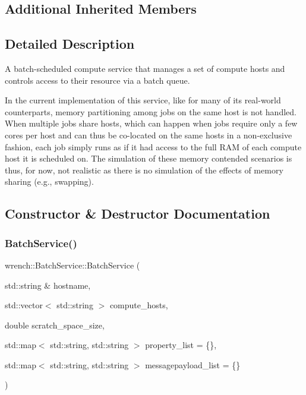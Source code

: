 \subsection*{Additional Inherited Members}


\subsection{Detailed Description}
A batch-\/scheduled compute service that manages a set of compute hosts and controls access to their resource via a batch queue. 

In the current implementation of this service, like for many of its real-\/world counterparts, memory partitioning among jobs on the same host is not handled. When multiple jobs share hosts, which can happen when jobs require only a few cores per host and can thus be co-\/located on the same hosts in a non-\/exclusive fashion, each job simply runs as if it had access to the full R\+AM of each compute host it is scheduled on. The simulation of these memory contended scenarios is thus, for now, not realistic as there is no simulation of the effects of memory sharing (e.\+g., swapping). 

\subsection{Constructor \& Destructor Documentation}
\mbox{\label{classwrench_1_1_batch_service_a2f91405c977001fa52acda0fe849f143}} 
\subsubsection{\texorpdfstring{Batch\+Service()}{BatchService()}}
{\footnotesize\ttfamily wrench\+::\+Batch\+Service\+::\+Batch\+Service (\begin{DoxyParamCaption}\item[{std\+::string \&}]{hostname,  }\item[{std\+::vector$<$ std\+::string $>$}]{compute\+\_\+hosts,  }\item[{double}]{scratch\+\_\+space\+\_\+size,  }\item[{std\+::map$<$ std\+::string, std\+::string $>$}]{property\+\_\+list = {\ttfamily \{\}},  }\item[{std\+::map$<$ std\+::string, std\+::string $>$}]{messagepayload\+\_\+list = {\ttfamily \{\}} }\end{DoxyParamCaption})}



